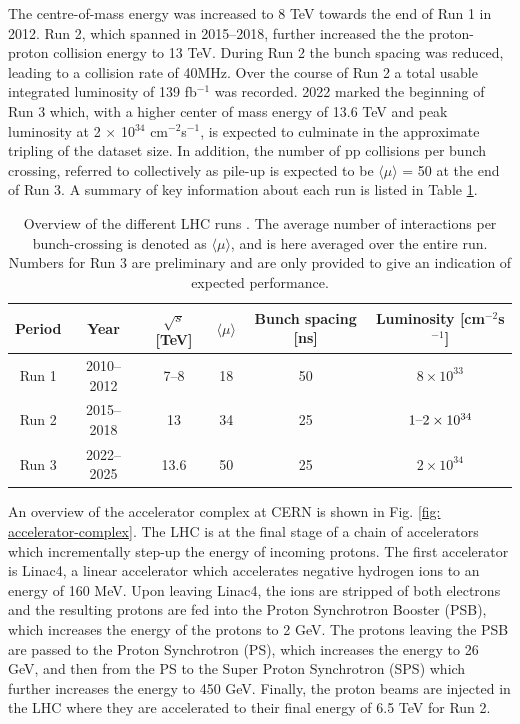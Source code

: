 The centre-of-mass energy was increased to 8 TeV towards the end of Run 1 in 2012. Run 2, which spanned in 2015–2018, further increased the the proton-proton collision energy to 13 TeV. During Run 2 the bunch spacing was reduced, leading to a collision rate of 40MHz. Over the course of Run 2 a total usable integrated luminosity of 139 fb$^{−1}$ was recorded. 2022 marked the beginning of Run 3 which, with a higher center of mass energy of 13.6 TeV and peak luminosity at 2 $\times$ 10$^{34}$ cm$^{−2}$s$^{−1}$, is expected to culminate in the approximate tripling of the dataset size. In addition, the number of pp collisions per bunch crossing, referred to collectively as pile-up is expected to be $\langle \mu \rangle$ = 50 at the end of Run 3. A summary of key information about each run is listed in Table \ref{tab:lhc-runs}.

\begin{table}[!htbp]
  \footnotesize\centering
  \setlength{\tabcolsep}{0.5em} %
  \begin{tabular}{cc|cccc}
      \toprule
      \textbf{Period} & \textbf{Year} & $\sqrt{s}$ [TeV] 
      & $\langle \mu \rangle$ & \textbf{Bunch spacing} [ns] & \textbf{Luminosity} [cm$^{−2}$s$^{−1}$] \\
      \hline
      Run 1 & 2010--2012 & \SIrange[range-phrase=--,range-units=single,range-exponents=combine]{7}{8}{} & 18 & 50 & $8 \times 10^{33}$ \\
      Run 2 & 2015--2018 & \SI{13  }{} & 34 & 25 & $1\textnormal{--}2 \times 10^{34}$ \\
      Run 3 & 2022--2025 & \SI{13.6}{} & 50 & 25 & $2 \times 10^{34}$ \\
      \bottomrule
  \end{tabular}
  \caption{
    Overview of the different \ac{LHC} runs \cite{atlas-lumi-run1,atlas-lumi-run2}.
    The average number of interactions per bunch-crossing is denoted as $\langle \mu \rangle$, and is here averaged over the entire run. Numbers for Run 3 are preliminary and are only provided to give an indication of expected performance.
  }
  \label{tab:lhc-runs}
\end{table}

An overview of the accelerator complex at CERN is shown in Fig. \ref{fig: accelerator-complex}. The \ac{LHC} is at the final stage of a chain of accelerators which incrementally step-up the energy of incoming protons. The first accelerator is Linac4, a linear accelerator which accelerates negative hydrogen ions to an energy of 160 MeV. Upon leaving Linac4, the ions are stripped of both electrons and the resulting protons are fed into the Proton Synchrotron Booster (PSB), which increases the energy of the protons to 2 GeV. The protons leaving the PSB are passed to the Proton Synchrotron (PS), which increases the energy to 26 GeV, and then from the PS to the Super Proton Synchrotron (SPS) which further increases the energy to 450 GeV. Finally, the proton beams are injected in the \ac{LHC} where they are accelerated to their final energy of 6.5 TeV for Run 2.

